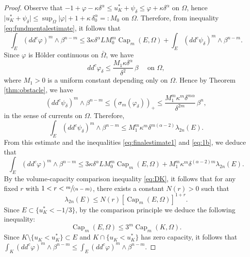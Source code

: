 \documentclass[JEP,XML,SOM,Unicode]{cedram}
\newcommand{\spfrac}[2]{\sfrac{#1}{(#2)}}
\theoremstyle{definition}
\DeclareMathOperator{\Capa}{Cap}
\begin{document}
\begin{proof}
Observe that $-1 + \varphi - \kappa \delta^\alpha \leq u_K^* + \psi_\delta \leq \varphi + \kappa \delta^\alpha$ on $\Omega$, hence $\vert u_K^* + \psi_\delta\vert \leq \sup_{\Omega} \vert \varphi\vert + 1 + \kappa \, \delta_0^\alpha =: M_0$ on $\Omega$. Therefore, from inequality \eqref{eq:fundmentalestimate}, it follows that
\begin{equation} \label{eq:finalestimate1}
\int_{E}(dd^c\varphi)^m\wedge\beta^{n-m} \leq 3 \kappa \delta^\alpha L M_0^m \Capa_m (E,\Omega) + \int_{E}(dd^c\psi_{\delta})^m\wedge\beta^{n-m}.
\end{equation}
Since $\varphi$ is Hölder continuous on $\bar \Omega$, we have
\begin{equation}\label{eq:1a}
dd^c\varphi_{\delta}\leq\frac{M_1 \kappa \delta^\alpha}{\delta^{2}}\, \beta \quad\text{ on } \Omega,
\end{equation}
where $M_1 > 0$ is a uniform constant depending only on $\Omega$. Hence by Theorem \ref{thm:obstacle}, we have
\begin{equation}\label{eq:1b}
(dd^c\psi_{\delta})^m\wedge\beta^{n-m} \leq (\sigma_m (\varphi_{\delta}))_+ \leq\frac{M_1^m \kappa^m \delta^{m \alpha}}{\delta^{2 m}}\, \beta^n,
\end{equation}
in the sense of currents on $ \Omega$. Therefore,
\[
\int_{E}(dd^c\psi_{\delta})^m\wedge\beta^{n-m}\leq M_1^{m} \kappa^m \delta^{ m (\alpha -2)} \lambda_{2 n} (E).
\]
From this estimate and the inequalities \eqref{eq:finalestimate1} and \eqref{eq:1b}, we deduce that
\begin{equation} \label{eq:finalestimate2}
\int_{E}(dd^c\varphi)^m\wedge\beta^{n-m} \leq 3 \kappa \delta^{\alpha} L M_0^m \Capa_m (E,\Omega)+ M_1^{m} \kappa^m \delta^{(\alpha -2)m} \lambda_{2 n} (E).
\end{equation}
By the volume-capacity comparison inequality \eqref{eq:DK}, it follows that for any fixed $r$ with $1 < r < \spfrac{m}{n - m}$, there exists a constant $N (r) > 0$ such that
\begin{equation} \label{eq:volumeestimate}
\lambda_{2 n}(E) \leq N (r) [\Capa_m(E,\Omega)]^{1 + r}.
\end{equation}
Since $ E \subset\{u_K^* < - 1 \slash 3\}$, by the comparison principle we deduce the following inequality:
\begin{equation}\label{eq:2}
\Capa_m (E,\Omega) \leq 3^{m} \Capa_m (K,\Omega).
\end{equation}
Since $K \setminus \{u_K < u_K^*\} \subset E$ and $K \cap \{u_K < u_K^*\}$ has zero capacity, it follows that $\int_K (dd^c\varphi)^m\wedge\beta^{n-m} \leq \int_E (dd^c\varphi)^m\wedge\beta^{n-m}$.


\end{proof}
\end{document}

